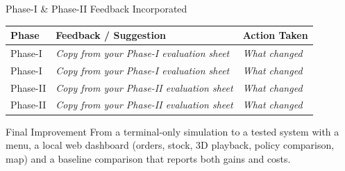 \documentclass[aspectratio=169,11pt]{beamer}
\newcommand{\todo}[1]{\textit{\color{red}#1}}
\begin{document}
\begin{frame}{Phase-I \& Phase-II Feedback Incorporated}
\scriptsize
\begin{center}
\renewcommand{\arraystretch}{1.35}
\begin{tabularx}{.96\textwidth}{@{}p{2.1cm}X X@{}}
\toprule
\textbf{Phase} & \textbf{Feedback / Suggestion} & \textbf{Action Taken}\\
\midrule
Phase-I & \todo{Copy from your Phase-I evaluation sheet} & \todo{What changed}\\
Phase-I & \todo{Copy from your Phase-I evaluation sheet} & \todo{What changed}\\
Phase-II & \todo{Copy from your Phase-II evaluation sheet} & \todo{What changed}\\
Phase-II & \todo{Copy from your Phase-II evaluation sheet} & \todo{What changed}\\
\bottomrule
\end{tabularx}
\end{center}
\vfill
\begin{block}{Final Improvement}
From a terminal-only simulation to a tested system with a menu, a local web dashboard (orders, stock, 3D playback, policy comparison, map) and a baseline comparison that reports both gains and costs.
\end{block}
\end{frame}
\end{document}
